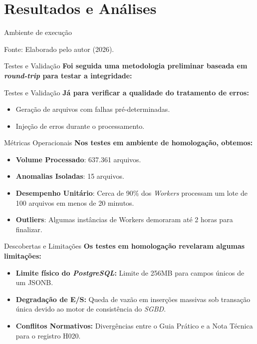 \section{Resultados e Análises}

\begin{frame}{Ambiente de execução}
    \centering

    \vspace{0.2cm}
    \small{Fonte: Elaborado pelo autor (2026).}
\end{frame}

\begin{frame}{Testes e Validação}
    \textbf{Foi seguida uma metodologia preliminar baseada em \textit{round-trip} para testar a integridade:}

\end{frame}

\begin{frame}{Testes e Validação}
    \textbf{Já para verificar a qualidade do tratamento de erros:}
    \begin{itemize}
        \item Geração de arquivos com falhas pré-determinadas.
        \item Injeção de erros durante o processamento.
    \end{itemize}
\end{frame}

\begin{frame}{Métricas Operacionais}
    \textbf{Nos testes em ambiente de homologação, obtemos:}
    \begin{itemize}
        \item \textbf{Volume Processado}: 637.361 arquivos.
        \item \textbf{Anomalias Isoladas}: 15 arquivos.
        \item \textbf{Desempenho Unitário}: Cerca de 90\% dos \textit{Workers} processam um lote de 100 arquivos em menos de 20 minutos.
        \item \textbf{Outliers}: Algumas instâncias de {Workers} demoraram até 2 horas para finalizar.
    \end{itemize}
\end{frame}

\begin{frame}{Descobertas e Limitações}
    \textbf{Os testes em homologação revelaram algumas limitações:}
    \begin{itemize}
        \item \textbf{Limite físico do \textit{PostgreSQL}:} Limite de 256MB para campos únicos de um JSONB.
        \item \textbf{Degradação de E/S:} Queda de vazão em inserções massivas sob transação única devido ao motor de consistência do \textit{SGBD}.
        \item \textbf{Conflitos Normativos:} Divergências entre o Guia Prático e a Nota Técnica para o registro H020.
    \end{itemize}
\end{frame}
